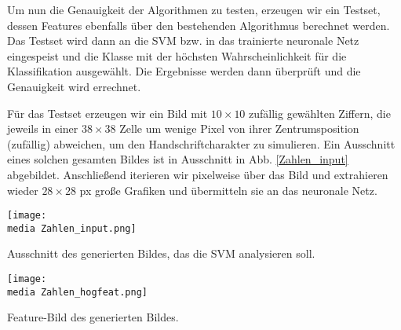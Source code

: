 Um nun die Genauigkeit der Algorithmen zu testen, erzeugen wir ein Testset, dessen Features ebenfalls über den bestehenden Algorithmus berechnet werden. Das Testset wird dann an die SVM bzw. in das trainierte neuronale Netz eingespeist und die Klasse mit der h\"ochsten Wahrscheinlichkeit f\"ur die Klassifikation ausgew\"ahlt. Die Ergebnisse werden dann überprüft und die Genauigkeit wird errechnet.

F\"ur das Testset erzeugen wir ein Bild mit $10 \times 10$ zufällig gewählten Ziffern, die jeweils in einer $38 \times 38$ Zelle um wenige Pixel von ihrer Zentrumsposition (zuf\"allig) abweichen, um den Handschriftcharakter zu simulieren. Ein Ausschnitt eines solchen gesamten Bildes ist in Ausschnitt in Abb. \ref{Zahlen_input} abgebildet. Anschließend iterieren wir pixelweise über das Bild und extrahieren wieder $28 \times 28$ px große Grafiken und übermitteln sie an das neuronale Netz.

\begin{dsafigure}
\begin{center}
	\texttt{[image: \\media Zahlen\_input.png]}
	\caption{Ausschnitt des generierten Bildes, das die SVM analysieren soll.}
	\label{Zahlen_input}
\end{center}
\end{dsafigure}

\begin{dsafigure}
\begin{center}
	\texttt{[image: \\media Zahlen\_hogfeat.png]}
	\caption{Feature-Bild des generierten Bildes.}
	\label{Zahlen_hogfeat}
\end{center}
\end{dsafigure}

